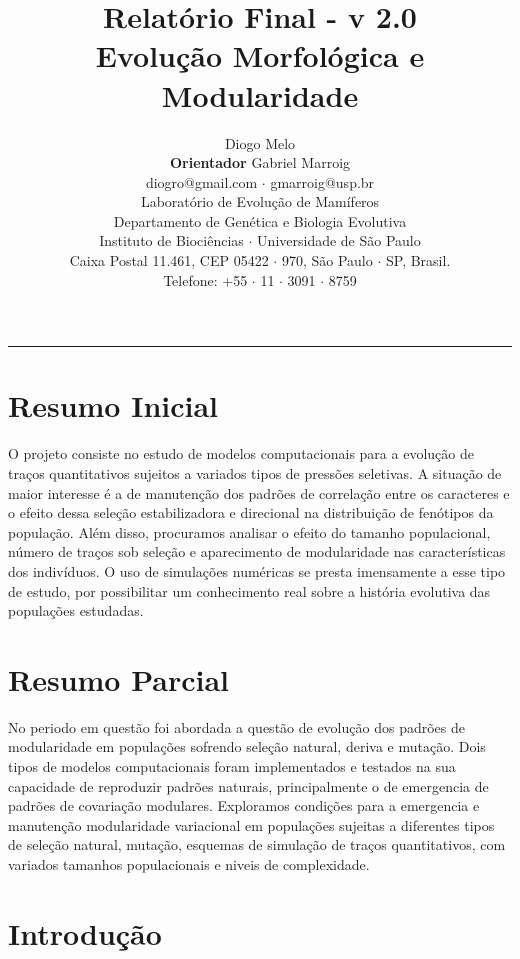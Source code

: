 \documentclass[a4paper, 12pt, titlepage, onecolumn]{article}
\title{
  \Large{Relatório Final - v 2.0} \\
  \Huge{Evolução Morfológica e Modularidade }}
\author{Diogo Melo \\
        \textbf {Orientador} Gabriel Marroig\\
  \footnotesize{diogro@gmail.com $\cdot$ gmarroig@usp.br} \\
  \footnotesize{Laboratório de Evolução de Mamíferos} \\
  \footnotesize{Departamento de Genética e Biologia Evolutiva} \\
  \footnotesize{Instituto de Biociências $\cdot$ Universidade de São Paulo} \\
  \footnotesize{Caixa Postal 11.461, CEP 05422 $\cdot$ 970, 
    São Paulo $\cdot$ SP, Brasil.} \\
  \footnotesize{Telefone: +55 $\cdot$ 11 $\cdot$ 3091 $\cdot$ 8759} \\
}
\numberwithin{equation}{section}
\numberwithin{table}{section}
\begin{document}
\pagestyle{plain} %
\renewcommand{\headrulewidth}{0.4pt}
\renewcommand{\footrulewidth}{0.4pt}
\maketitle
\thispagestyle{plain} %
\hrule %
\tableofcontents


\section{Resumo Inicial}
\doublespacing 
O projeto consiste no estudo de modelos computacionais para a evolução
de traços quantitativos sujeitos a variados tipos de pressões seletivas.
A situação de maior interesse é a de manutenção dos padrões de
correlação entre os caracteres e o efeito dessa seleção estabilizadora
e direcional na distribuição de fenótipos da população. Além disso, procuramos
analisar o efeito do tamanho populacional, número de traços sob seleção e
aparecimento de modularidade nas características dos indivíduos. O uso
de simulações numéricas se presta imensamente a esse tipo de estudo, por
possibilitar um conhecimento real sobre a história evolutiva das
populações estudadas.

\section{Resumo Parcial}

No periodo em questão foi abordada a questão de evolução dos padrões de
modularidade em populações sofrendo seleção natural, deriva e mutação.
Dois tipos de modelos computacionais foram implementados e testados na
sua capacidade de reproduzir padrões naturais, principalmente o de
emergencia de padrões de covariação modulares. Exploramos condições para
a emergencia e manutenção modularidade variacional em populações
sujeitas a diferentes tipos de seleção natural, mutação, esquemas de
simulação de traços quantitativos, com variados tamanhos populacionais e
niveis de complexidade.

\section{Introdução}
\linenumbers
\modulolinenumbers[1]
\end{document}

